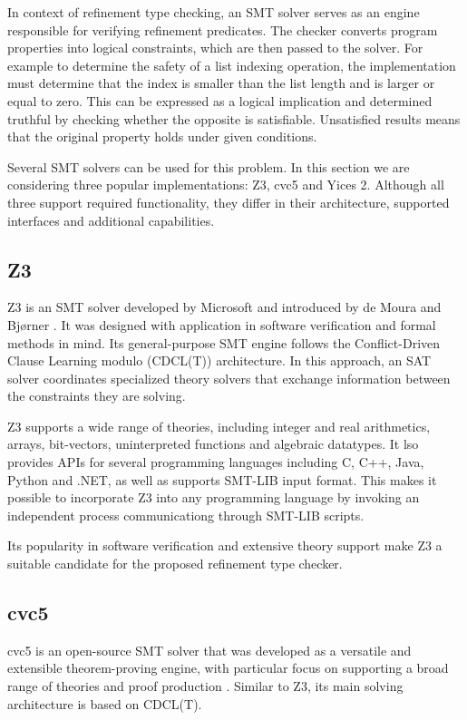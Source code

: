 In context of refinement type checking, an SMT solver serves as an engine responsible for verifying
refinement predicates. The checker converts program properties into logical constraints, which are then
passed to the solver. For example to determine the safety of a list indexing operation, the implementation must determine
that the index is smaller than the list length and is larger or equal to zero. This can be expressed 
as a logical implication and determined truthful by checking whether the opposite is satisfiable.
Unsatisfied results means that the original property holds under given conditions.

Several SMT solvers can be used for this problem. In this section we are considering three popular
implementations: Z3, cvc5 and Yices 2. Although all three support required functionality, they differ in
their architecture, supported interfaces and additional capabilities.

\subsection{Z3}
Z3 is an SMT solver developed by Microsoft and introduced by de Moura and Bjørner \cite{demouraZ3EfficientSMT2008}.
It was designed with application in software verification and formal methods in mind. Its general-purpose
SMT engine follows the Conflict-Driven Clause Learning modulo (CDCL(T)) architecture. In this approach,
an SAT solver coordinates specialized theory solvers that exchange information between the constraints they are
solving.

Z3 supports a wide range of theories, including integer and real arithmetics, arrays, bit-vectors,
uninterpreted functions and algebraic datatypes. It lso provides APIs for several programming languages
including C, C++, Java, Python and .NET, as well as supports SMT-LIB input format. This makes it possible
to incorporate Z3 into any programming language by invoking an independent process communicationg through
SMT-LIB scripts.

Its popularity in software verification and extensive theory support make Z3 a suitable candidate for
the proposed refinement type checker.

\subsection{cvc5}
cvc5 is an open-source SMT solver that was developed as a versatile and extensible theorem-proving
engine, with particular focus on supporting a broad range of theories and proof production \cite{barbosaCvc5VersatileIndustrialStrength2022}.
Similar to Z3, its main solving architecture is based on CDCL(T).

